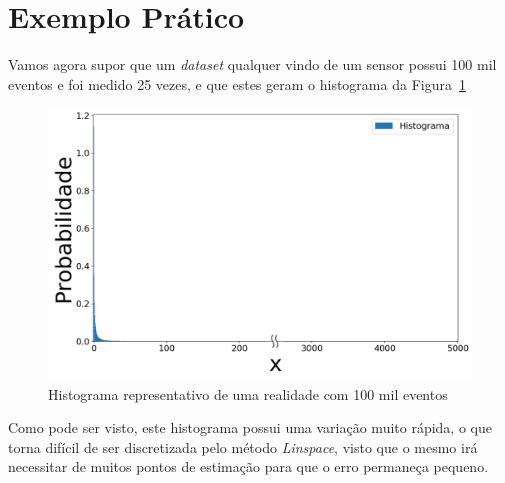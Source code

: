 \section{Exemplo Prático}
Vamos agora supor que um \textit{dataset} qualquer vindo de um sensor possui 100 mil eventos e foi medido 25 vezes, e que estes geram o histograma da Figura~\ref{fig:log22}

\begin{figure}[H]
	\centering 
	\includegraphics[width=0.6\linewidth]{./figuras/datalognormal_0_2_2}
	\caption{Histograma representativo de uma realidade com 100 mil eventos}
	\label{fig:log22}
\end{figure}

Como pode ser visto, este histograma possui uma variação muito rápida, o que torna difícil de ser discretizada pelo método \textit{Linspace}, visto que o mesmo irá necessitar de muitos pontos de estimação para que o erro permaneça pequeno.

